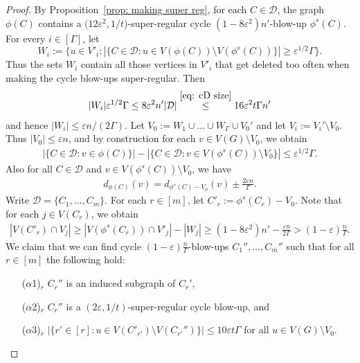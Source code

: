 \documentclass[a4paper, 11pt, reqno]{amsart}
\numberwithin{equation}{section}
\newcommand{\1}{{\rm 1\hspace*{-0.4ex}%
\rule{0.1ex}{1.52ex}\hspace*{0.2ex}}}
\newcommand{\cD}{\mathcal{D}}
\renewcommand{\epsilon}{\varepsilon}
\newcommand{\sm}{\setminus}
\begin{document}
\begin{proof}
By Proposition~\ref{prop: making super reg},
for each $C\in \cD$, 
the graph $\phi(C)$ contains a $(12\epsilon^2, 1/t$)-super-regular cycle $(1-8\epsilon^2)n'$-blow-up $\phi^s(C)$.
For every $i\in[\Gamma]$, let 
$$W_i:=\{  u\in V'_i: |\{C \in \cD: u\in V(\phi(C)) \sm V(\phi^s(C)) \}|\geq \epsilon^{1/2} \Gamma  \}.$$
Thus the sets $W_i$ contain all those vertices in $V'_i$ that get deleted too often when making the cycle blow-ups super-regular. 
Then
\begin{align*}
	|W_i|\epsilon^{1/2}\Gamma \leq 8\epsilon^2 n'|\cD| \stackrel{\eqref{eq: cD size}}{\leq} 16 \epsilon^2t\Gamma n'
\end{align*}
and hence $|W_i|\leq \epsilon n/(2\Gamma)$.
Let $V_0:=W_1\cup \ldots \cup W_\Gamma \cup V_0'$ and let $V_i:=V_i'\sm V_0$.
Thus $|V_0|\leq \epsilon n$, 
and by construction for each $v\in V(G)\sm V_0$, we obtain
\begin{align}\label{eq: not disregard too many}
|\{C \in \cD : v\in \phi(C)  \}| - |\{C\in \cD: v\in V(\phi^s(C))\setminus V_0\}| \leq \epsilon^{1/2}\Gamma.
\end{align}
Also for all $C\in \cD$ and $v\in V(\phi^s(C))\sm V_0$, we have
\begin{align}\label{eq:deg phis}
	d_{\phi(C)}(v)= d_{\phi^s(C)-V_0}(v)\pm \frac{2\epsilon n}{\Gamma}.
\end{align}
Write $\cD=\{C_1,\dots, C_m\}$.
For each $r\in [m]$, let $C'_{r}:=\phi^s(C_r)- V_0$. 
Note that for each $j\in V(C_{r})$, we obtain
\begin{align}\label{eq: C'-V0 cluster size}
|V(C'_{r})\cap V_j| 
\geq |V(\phi^s(C_{r}))\cap V'_j| -|W_j| 
\geq (1- 8\epsilon^2) n' - \frac{\epsilon n}{2\Gamma} 
> (1-\epsilon)\frac{n}{\Gamma}.
\end{align}
We claim that we can find cycle $(1-\epsilon)\frac{n}{\Gamma}$-blow-ups $C_1'',\ldots, C_{m}''$ such that 
for all ${r}\in [m]$ the following hold:
\begin{itemize}
\item[($\alpha$1)$_r$] $C_{r}''$ is an induced subgraph of $C_{r}'$,
\item[($\alpha$2)$_r$] $C_{r}''$ is a $(2\epsilon,1/t)$-super-regular cycle blow-up, and
\item[($\alpha$3)$_r$] $|\{r'\in [r]: u\in V(C'_{r'})\sm V(C_{r'}'')\}|\leq 10\epsilon t \Gamma$ for all $u\in V(G)\sm V_0$.
\end{itemize}



\end{proof}
\end{document}
